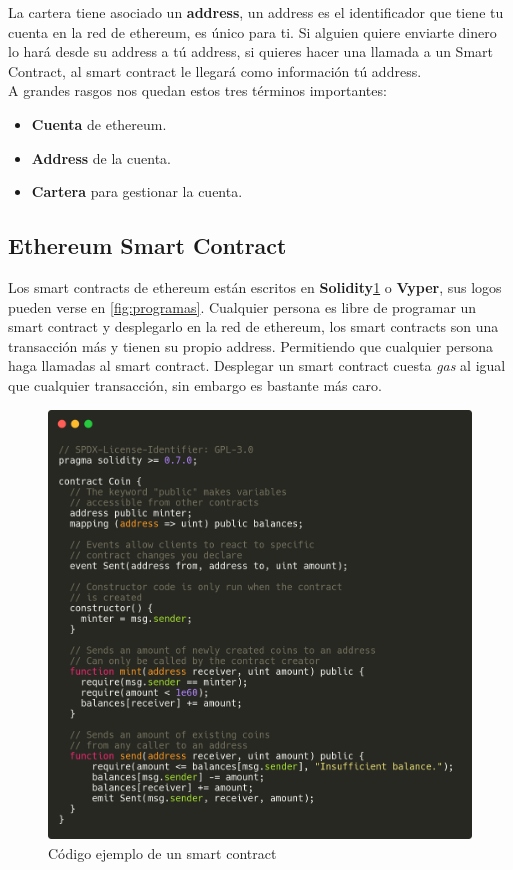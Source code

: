 La cartera tiene asociado un \textbf{address}, un address es el identificador que tiene tu cuenta en la red de ethereum, es único para ti. Si alguien quiere enviarte dinero lo hará desde su address a tú address, si quieres hacer una llamada a un Smart Contract, al smart contract le llegará como información tú address. \\

A grandes rasgos nos quedan estos tres términos importantes:
\begin{itemize}
\item \textbf{Cuenta} de ethereum.
\item \textbf{Address} de la cuenta.
\item \textbf{Cartera} para gestionar la cuenta.
\end{itemize}

\subsection{Ethereum Smart Contract}

Los smart contracts de ethereum están escritos en \textbf{Solidity}\cite{SolidityDocs}\ref{fig:soliditySmartContractEntero} o \textbf{Vyper}\cite{VyperDocs}, sus logos pueden verse en \ref{fig:programas}. Cualquier persona es libre de programar un smart contract y desplegarlo en la red de ethereum, los smart contracts son una transacción más y tienen su propio address. Permitiendo que cualquier persona haga llamadas al smart contract. Desplegar un smart contract cuesta \emph{gas} al igual que cualquier transacción, sin embargo es bastante más caro. 

\begin{figure}[h!]
  \centering
  \includegraphics[width=0.7\linewidth]{figs/EstadoArte/Ethereum/SmartContract}
  \caption[Código ejemplo de un smart contract]{Código ejemplo de un smart contract}
  \label{fig:soliditySmartContractEntero}
\end{figure}

